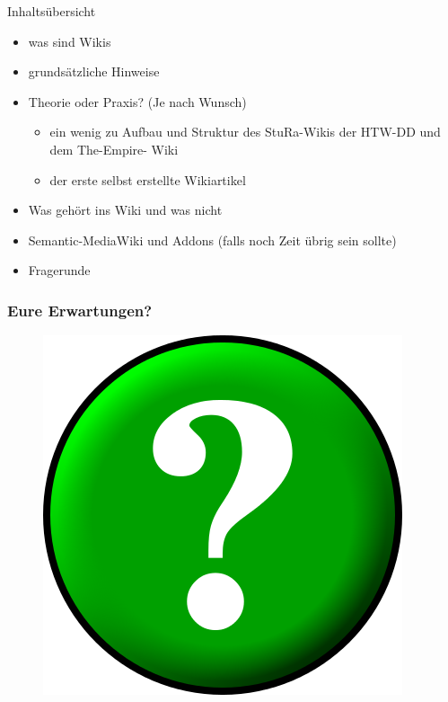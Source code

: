 \documentclass{beamer}
\begin{document}
\begin{frame}{Inhaltsübersicht}
  \begin{itemize}
    \item was sind Wikis
    \item grundsätzliche Hinweise
    \item Theorie oder Praxis? (Je nach Wunsch)
    \begin{itemize}
      \item ein wenig zu Aufbau und Struktur des StuRa-Wikis der HTW-DD und dem The-Empire- Wiki
      \item der erste selbst erstellte Wikiartikel
    \end{itemize}
    \item Was gehört ins Wiki und was nicht
    \item Semantic-MediaWiki und Addons (falls noch Zeit übrig sein sollte)
    \item Fragerunde
  \end{itemize}
\end{frame}


\begin{frame}
  \frametitle{Eure Erwartungen?}

  \begin{figure}
      \begin{center}
        \includegraphics[scale=0.5]{Circle-question_400x400.png}
        \label{fig:Fragezeichenschild}
      \end{center}
    \end{figure}
  
\end{frame}
\end{document}
